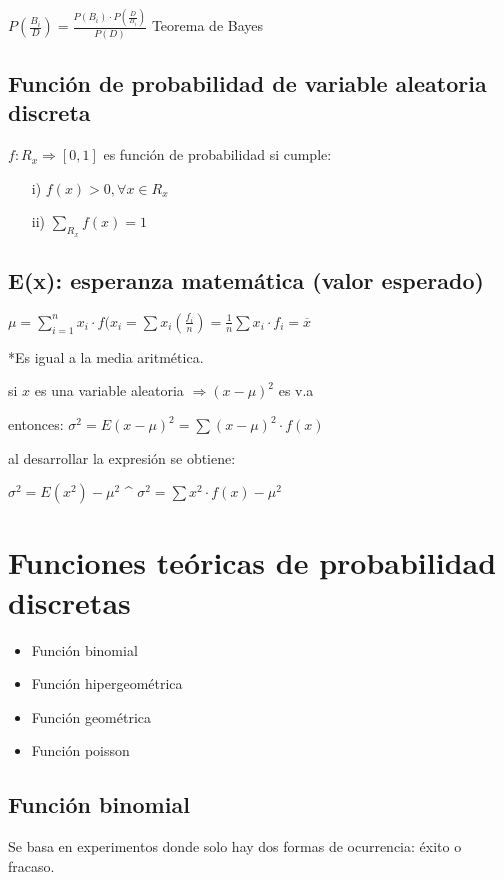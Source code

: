 \documentclass[12pt]{report}
\begin{document}
\begin{large}
\begin{center}
$\displaystyle P\left( \frac{B_i}{D} \right) =\frac{P(B_i)\cdot P\left(
\frac{D}{B_i}\right)}{P(D)} $ Teorema de Bayes
\newpage

\subsection*{Función de probabilidad de variable aleatoria discreta}

$\displaystyle f:R_x \Rightarrow [0,1]$ es función de probabilidad si cumple:
\begin{itemize}
	\item[i)]
		$\displaystyle f(x) > 0, \forall x \in R_x$
	\item[ii)]
		$\displaystyle \sum_{R_x}{f(x)}=1$
\end{itemize}

\subsection*{E(x): esperanza matemática (valor esperado)}

$\displaystyle \mu = \sum_{i=1}^{n}{x_i\cdot f(x_i}=\sum{x_i \left(
\frac{f_i}{n}
\right)}=\frac{1}{n}\sum{x_i\cdot f_i}=\overline{x}$

*Es igual a la media aritmética.
\linebreak

si $\displaystyle x$ es una variable aleatoria $\displaystyle \Rightarrow (x-\mu)^2$ es v.a

entonces: $\displaystyle \sigma^2= E(x-\mu)^2 = \sum(x-\mu)^2\cdot f(x)$

al desarrollar la expresión se obtiene:

$\displaystyle \sigma^2 = E(x^2)-\mu^2$   \textbf{  \^  }   $\displaystyle \sigma^2 = \sum x^2\cdot f(x) -\mu^2 $
\newpage

\section*{Funciones teóricas de probabilidad discretas}

\begin{itemize}
	\item
		Función binomial
	\item
		Función hipergeométrica
	\item
		Función geométrica
	\item
		Función poisson
\end{itemize}

\subsection*{Función binomial}
Se basa en experimentos donde solo hay dos formas de ocurrencia: éxito o fracaso.


\end{center}
\end{large}
\end{document}
